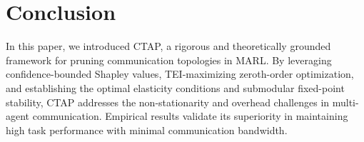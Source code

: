 \documentclass{article}
\begin{document}
\section{Conclusion}
In this paper, we introduced CTAP, a rigorous and theoretically grounded framework for pruning communication topologies in MARL. By leveraging confidence-bounded Shapley values, TEI-maximizing zeroth-order optimization, and establishing the optimal elasticity conditions and submodular fixed-point stability, CTAP addresses the non-stationarity and overhead challenges in multi-agent communication. Empirical results validate its superiority in maintaining high task performance with minimal communication bandwidth.


\end{document}
